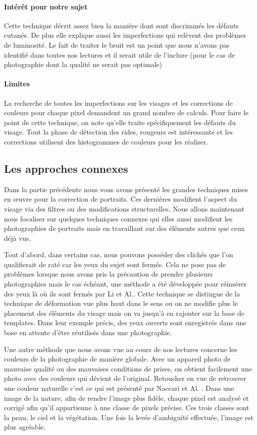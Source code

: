 \documentclass[11pt, french,screen]{report-rd-info}
\begin{document}
\paragraph{Intérêt pour notre sujet}
Cette technique décrit assez bien la manière dont sont discriminés les défauts cutanés. De plus elle explique aussi les imperfections qui relèvent des problèmes de luminosité. Le fait de traiter le bruit est un point que nous n’avons pas identifié dans toutes nos lectures et il serait utile de l’inclure (pour le cas de photographie dont la qualité ne serait pas optimale)
\paragraph{Limites}
La recherche de toutes les imperfections sur les visages et les corrections de couleurs pour chaque pixel demandent un grand nombre de calculs.
Pour faire le point de cette technique, on note qu’elle traite spécifiquement les défauts du visage. Tout la phase de détection des rides, rougeurs est intéressante et les corrections utilisent des histogrammes de couleurs pour les réaliser.
\subsection{Les approches connexes}
Dans la partie précédente nous vous avons présenté les grandes techniques mises en œuvre pour la correction de portraits. Ces dernières modifient l’aspect du visage via des filtres ou des modifications structurelles. Nous allons maintenant nous focaliser sur quelques techniques connexes qui elles aussi modifient les photographies de portraits mais en travaillant sur des éléments autres que ceux déjà vus.

Tout d’abord, dans certains cas, nous pouvons posséder des clichés que l'on qualifierait de raté car les yeux du sujet sont fermés. Cela ne pose pas de problèmes lorsque nous avons pris la précaution de prendre plusieurs photographies mais le cas échéant, une méthode a été développée pour réinsérer des yeux là où ils sont fermés par Li et Al.\cite{Li2011}. Cette technique se distingue de la technique de déformation vue plus haut dans le sens ou on ne modifie plus le placement des éléments du visage mais on va jusqu'à en rajouter sur la base de templates. Dans leur exemple précis, des yeux ouverts sont enregistrés dans une base en attente d’être réutilisés dans une photographie.

Une autre méthode que nous avons vue au cours de nos lectures concerne les couleurs de la photographie de manière globale. Avec un appareil photo de mauvaise qualité ou des mauvaises conditions de prises, on obtient facilement une photo avec des couleurs qui dévient de l’original. Retoucher en vue de retrouver une couleur naturelle c'est ce qui est présenté par Naccari et Al. \cite{Naccari}. Dans une image de la nature, afin de rendre l’image plus fidèle, chaque pixel est analysé et corrigé afin qu’il appartienne à une classe de pixels précise. Ces trois classes sont la peau, le ciel et la végétation. Une fois la levée d’ambiguïté effectuée, l’image est plus agréable.
\end{document}

